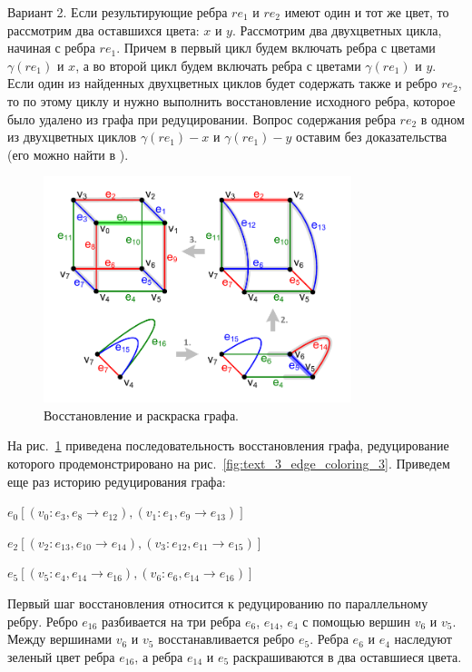 Вариант 2. Если результирующие ребра $re_1$ и $re_2$ имеют один и тот же цвет, то рассмотрим два оставшихся цвета: $x$ и $y$.
Рассмотрим два двухцветных цикла, начиная с ребра $re_1$.
Причем в первый цикл будем включать ребра с цветами $\gamma(re_1)$ и $x$, а во второй цикл будем включать ребра с цветами $\gamma(re_1)$ и $y$.
Если один из найденных двухцветных циклов будет содержать также и ребро $re_2$, то по этому циклу и нужно выполнить восстановление исходного ребра, которое было удалено из графа при редуцировании.
Вопрос содержания ребра $re_2$ в одном из двухцветных циклов $\gamma(re_1) - x$ и $\gamma(re_1) - y$ оставим без доказательства (его можно найти в \cite{Kurapov2018}).

\begin{figure}[ht]
\centering
\includegraphics[width=0.8\textwidth]{fig/par_edge_col_8-restore-and-repaint.pdf}
\singlespacing
{}\caption{Восстановление и раскраска графа.}
\label{fig:text_3_edge_coloring_8}
\end{figure}

На рис.~\ref{fig:text_3_edge_coloring_8} приведена последовательность восстановления графа, редуцирование которого продемонстрировано на рис.~\ref{fig:text_3_edge_coloring_3}.
Приведем еще раз историю редуцирования графа:

$e_0 [(v_0 : e_3, e_8 \rightarrow e_{12}), (v_1 : e_1, e_9 \rightarrow e_{13})]$

$e_2 [(v_2 : e_{13}, e_{10} \rightarrow e_{14}), (v_3 : e_{12}, e_{11} \rightarrow e_{15})]$

$e_5 [(v_5 : e_4, e_{14} \rightarrow e_{16}), (v_6 : e_6, e_{14} \rightarrow e_{16})]$

Первый шаг восстановления относится к редуцированию по параллельному ребру.
Ребро $e_{16}$ разбивается на три ребра $e_6$, $e_{14}$, $e_4$ с помощью вершин $v_6$ и $v_5$.
Между вершинами $v_6$ и $v_5$ восстанавливается ребро $e_5$.
Ребра $e_6$ и $e_4$ наследуют зеленый цвет ребра $e_{16}$, а ребра $e_{14}$ и $e_5$ раскрашиваются в два оставшиеся цвета.

